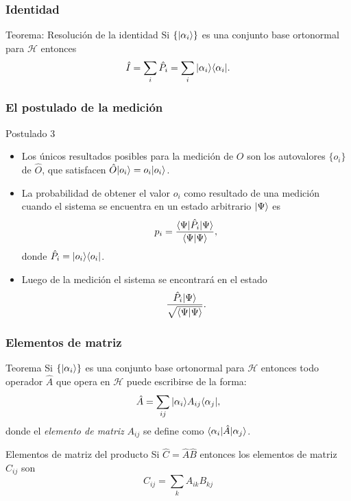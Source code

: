 \documentclass{beamer}
\begin{document}
\begin{frame}
    \frametitle{Identidad}

    \begin{block}{Teorema: Resolución de la identidad}
        Si $\{| \alpha_i \rangle\}$ es una conjunto base ortonormal para $\mathcal{H}$ entonces
        \[ \hat{I} = \sum_i \hat{P}_i = \sum_i | \alpha_i \rangle\langle \alpha_i |.\] 
    \end{block}

\end{frame} 

\begin{frame}
    \frametitle{El postulado de la medición}
    
    \begin{block}{Postulado 3}
        \begin{itemize}
            \item Los únicos resultados posibles para la medición de $O$ son los autovalores $\{o_i\}$ de $\hat{O}$, que satisfacen $\hat{O}| o_i \rangle=o_i| o_i \rangle$.
            \item La probabilidad de obtener el valor $o_i$ como resultado de una medición cuando el sistema se encuentra en un estado arbitrario $| \Psi \rangle$ es
            \[ p_i = \frac{\langle \Psi |\hat{P}_i| \Psi \rangle}{\langle \Psi | \Psi \rangle},\]
            donde $\hat{P}_i=| o_i \rangle\langle o_i |$.
            \item Luego de la medición el sistema se encontrará en el estado
            \[ \frac{\hat{P}_i| \Psi \rangle}{\sqrt{\langle \Psi | \Psi \rangle}}.\]
        \end{itemize} 
    \end{block}

\end{frame}

\begin{frame}
    \frametitle{Elementos de matriz}

    \begin{block}{Teorema}
        Si $\{| \alpha_i \rangle\}$ es una conjunto base ortonormal para $\mathcal{H}$ entonces todo operador $\hat{A}$ que opera en $\mathcal{H}$ puede escribirse de la forma:
        \[ \hat{A} = \sum_{ij} | \alpha_i \rangle A_{ij}\langle \alpha_j |,\]
        donde el {\em elemento de matriz} $A_{ij}$ se define como $\langle \alpha_i |\hat{A}| \alpha_j \rangle$.
    \end{block}
    \begin{block}{Elementos de matriz del producto}
        Si $\hat{C}=\hat{A}\hat{B}$ entonces los elementos de matriz $C_{ij}$ son
        \[ C_{ij} = \sum_k A_{ik}B_{kj} \]
    \end{block}

\end{frame} 
\end{document}
